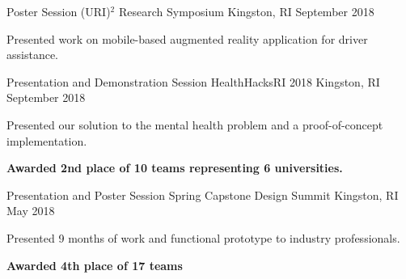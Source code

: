 \graduateheader
\begin{cventries}
    \cventry
    {Poster Session}
    {(URI)$^2$ Research Symposium}
    {Kingston, RI}
    {September 2018}
    {
      \begin{cvitems}
        \item{Presented work on mobile-based augmented reality application for driver assistance.}
      \end{cvitems}
    }
  \cventry
    {Presentation and Demonstration Session}
    {HealthHacksRI 2018}
    {Kingston, RI}
    {September 2018}
    {
      \begin{cvitems}
        \item{Presented our solution to the mental health problem and a proof-of-concept implementation.}
        \item{\textbf{Awarded 2nd place of 10 teams representing 6 universities.}}
      \end{cvitems}
    }
\end{cventries}
\vspace{-10 pt}
\ugradheader
\begin{cventries}
  \cventry
    {Presentation and Poster Session}
    {Spring Capstone Design Summit}
    {Kingston, RI}
    {May 2018}
    {
    \begin{cvitems}
      \item{Presented 9 months of work and functional prototype to industry professionals.}
      \item{\textbf{Awarded 4th place of 17 teams}}
    \end{cvitems}
    }
\end{cventries}
\vspace{-10 pt}